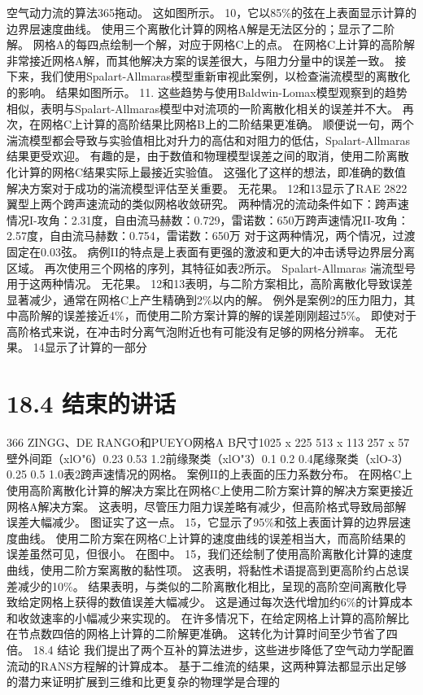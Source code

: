 \documentclass[UTF8,11pt,a4paper,openany,fontset=fandol]{ctexbook}
\begin{document}
空气动力流的算法365拖动。 这如图所示。 10，它以85\%的弦在上表面显示计算的边界层速度曲线。 使用三个离散化计算的网格A解是无法区分的；显示了二阶解。 网格A的每四点绘制一个解，对应于网格C上的点。 在网格C上计算的高阶解非常接近网格A解，而其他解决方案的误差很大，与阻力分量中的误差一致。 接下来，我们使用Spalart-Allmaras模型重新审视此案例，以检查湍流模型的离散化的影响。 结果如图所示。 11. 这些趋势与使用Baldwin-Lomax模型观察到的趋势相似，表明与Spalart-Allmaras模型中对流项的一阶离散化相关的误差并不大。 再次，在网格C上计算的高阶结果比网格B上的二阶结果更准确。 顺便说一句，两个湍流模型都会导致与实验值相比对升力的高估和对阻力的低估，Spalart-Allmaras结果更受欢迎。 有趣的是，由于数值和物理模型误差之间的取消，使用二阶离散化计算的网格C结果实际上最接近实验值。 这强化了这样的想法，即准确的数值解决方案对于成功的湍流模型评估至关重要。 无花果。 12和13显示了RAE 2822 翼型上两个跨声速流动的类似网格收敛研究。 两种情况的流动条件如下：跨声速情况I-攻角：2.31度，自由流马赫数：0.729，雷诺数：650万跨声速情况II-攻角：2.57度，自由流马赫数：0.754，雷诺数：650万 对于这两种情况，两个情况，过渡固定在0.03弦。 病例II的特点是上表面有更强的激波和更大的冲击诱导边界层分离区域。 再次使用三个网格的序列，其特征如表2所示。 Spalart-Allmaras 湍流型号用于这两种情况。 无花果。 12和13表明，与二阶方案相比，高阶离散化导致误差显著减少，通常在网格C上产生精确到2\%以内的解。 例外是案例2的压力阻力，其中高阶解的误差接近4\%，而使用二阶方案计算的解的误差刚刚超过5\%。 即使对于高阶格式来说，在冲击时分离气泡附近也有可能没有足够的网格分辨率。 无花果。 14显示了计算的一部分

\section{18.4 结束的讲话}
366 ZINGG、DE RANGO和PUEYO网格A B尺寸1025 x 225 513 x 113 257 x 57壁外间距（xlO"6）0.23 0.53 1.2前缘聚类（xlO"3）0.1 0.2 0.4尾缘聚类（xlO-3）0.25 0.5 1.0表2跨声速情况的网格。 案例II的上表面的压力系数分布。 在网格C上使用高阶离散化计算的解决方案比在网格C上使用二阶方案计算的解决方案更接近网格A解决方案。 这表明，尽管压力阻力误差略有减少，但高阶格式导致局部解误差大幅减少。 图证实了这一点。 15，它显示了95\%和弦上表面计算的边界层速度曲线。 使用二阶方案在网格C上计算的速度曲线的误差相当大，而高阶结果的误差虽然可见，但很小。 在图中。 15，我们还绘制了使用高阶离散化计算的速度曲线，使用二阶方案离散的黏性项。 这表明，将黏性术语提高到更高阶约占总误差减少的10\%。 结果表明，与类似的二阶离散化相比，呈现的高阶空间离散化导致给定网格上获得的数值误差大幅减少。 这是通过每次迭代增加约6\%的计算成本和收敛速率的小幅减少来实现的。 在许多情况下，在给定网格上计算的高阶解比在节点数四倍的网格上计算的二阶解更准确。 这转化为计算时间至少节省了四倍。 18.4 结论 我们提出了两个互补的算法进步，这些进步降低了空气动力学配置流动的RANS方程解的计算成本。 基于二维流的结果，这两种算法都显示出足够的潜力来证明扩展到三维和比更复杂的物理学是合理的
\end{document}
